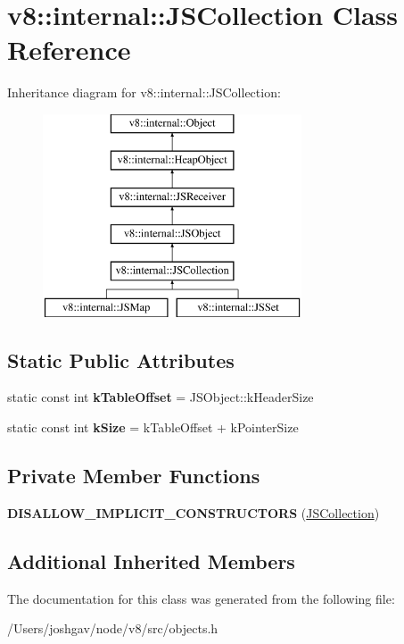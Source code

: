 \hypertarget{classv8_1_1internal_1_1_j_s_collection}{}\section{v8\+:\+:internal\+:\+:J\+S\+Collection Class Reference}
\label{classv8_1_1internal_1_1_j_s_collection}
Inheritance diagram for v8\+:\+:internal\+:\+:J\+S\+Collection\+:\begin{figure}[H]
\begin{center}
\leavevmode
\includegraphics[height=6.000000cm]{classv8_1_1internal_1_1_j_s_collection}
\end{center}
\end{figure}
\subsection*{Static Public Attributes}
\begin{DoxyCompactItemize}
\item 
static const int {\bfseries k\+Table\+Offset} = J\+S\+Object\+::k\+Header\+Size\hypertarget{classv8_1_1internal_1_1_j_s_collection_a42e776075fa6d614afa44278d85f4af8}{}\label{classv8_1_1internal_1_1_j_s_collection_a42e776075fa6d614afa44278d85f4af8}

\item 
static const int {\bfseries k\+Size} = k\+Table\+Offset + k\+Pointer\+Size\hypertarget{classv8_1_1internal_1_1_j_s_collection_ab6a359c87862432a69bfbc1be491ac8e}{}\label{classv8_1_1internal_1_1_j_s_collection_ab6a359c87862432a69bfbc1be491ac8e}

\end{DoxyCompactItemize}
\subsection*{Private Member Functions}
\begin{DoxyCompactItemize}
\item 
{\bfseries D\+I\+S\+A\+L\+L\+O\+W\+\_\+\+I\+M\+P\+L\+I\+C\+I\+T\+\_\+\+C\+O\+N\+S\+T\+R\+U\+C\+T\+O\+RS} (\hyperlink{classv8_1_1internal_1_1_j_s_collection}{J\+S\+Collection})\hypertarget{classv8_1_1internal_1_1_j_s_collection_a22e55ac3e5e5df36ebca759bf041daa3}{}\label{classv8_1_1internal_1_1_j_s_collection_a22e55ac3e5e5df36ebca759bf041daa3}

\end{DoxyCompactItemize}
\subsection*{Additional Inherited Members}


The documentation for this class was generated from the following file\+:\begin{DoxyCompactItemize}
\item 
/\+Users/joshgav/node/v8/src/objects.\+h\end{DoxyCompactItemize}
